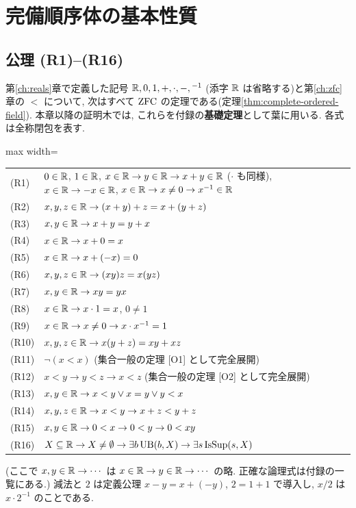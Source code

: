 \chapter{完備順序体の基本性質}\label{ch:ofield}

\section{公理 (R1)--(R16)}

第\ref{ch:reals}章で定義した記号 $\mathbb{R}, 0, 1, +, \cdot, -, {}^{-1}$ (添字 $\mathbb{R}$ は省略する)と第\ref{ch:zfc}章の $<$ について, 次はすべて $\mathrm{ZFC}$ の定理である(定理\ref{thm:complete-ordered-field}). 本章以降の証明木では, これらを付録の\textbf{基礎定理}として葉に用いる. 各式は全称閉包を表す.

\begin{center}\small
\begin{adjustbox}{max width=\linewidth}
\begin{tabular}{ll}
  \toprule
  (R1) & $0 \in \mathbb{R}$, \; $1 \in \mathbb{R}$, \; $x \in \mathbb{R} \to y \in \mathbb{R} \to x + y \in \mathbb{R}$ ($\cdot$ も同様), \; $x \in \mathbb{R} \to -x \in \mathbb{R}$, \; $x \in \mathbb{R} \to x \neq 0 \to x^{-1} \in \mathbb{R}$ \\
  (R2) & $x, y, z \in \mathbb{R} \to (x + y) + z = x + (y + z)$ \\
  (R3) & $x, y \in \mathbb{R} \to x + y = y + x$ \\
  (R4) & $x \in \mathbb{R} \to x + 0 = x$ \\
  (R5) & $x \in \mathbb{R} \to x + (-x) = 0$ \\
  (R6) & $x, y, z \in \mathbb{R} \to (x y) z = x (y z)$ \\
  (R7) & $x, y \in \mathbb{R} \to x y = y x$ \\
  (R8) & $x \in \mathbb{R} \to x \cdot 1 = x$, \; $0 \neq 1$ \\
  (R9) & $x \in \mathbb{R} \to x \neq 0 \to x \cdot x^{-1} = 1$ \\
  (R10) & $x, y, z \in \mathbb{R} \to x (y + z) = x y + x z$ \\
  (R11) & $\neg (x < x)$ \hfill (集合一般の定理 [O1] として完全展開) \\
  (R12) & $x < y \to y < z \to x < z$ \hfill (集合一般の定理 [O2] として完全展開) \\
  (R13) & $x, y \in \mathbb{R} \to x < y \lor x = y \lor y < x$ \\
  (R14) & $x, y, z \in \mathbb{R} \to x < y \to x + z < y + z$ \\
  (R15) & $x, y \in \mathbb{R} \to 0 < x \to 0 < y \to 0 < x y$ \\
  (R16) & $X \subseteq \mathbb{R} \to X \neq \emptyset \to \exists b\,\mathrm{UB}(b, X) \to \exists s\,\mathrm{IsSup}(s, X)$ \\
  \bottomrule
\end{tabular}
\end{adjustbox}
\end{center}
(ここで $x, y \in \mathbb{R} \to \cdots$ は $x \in \mathbb{R} \to y \in \mathbb{R} \to \cdots$ の略. 正確な論理式は付録の一覧にある.) 減法と $2$ は定義公理 $x - y = x + (-y)$, $2 = 1 + 1$ で導入し, $x/2$ は $x \cdot 2^{-1}$ のことである.

